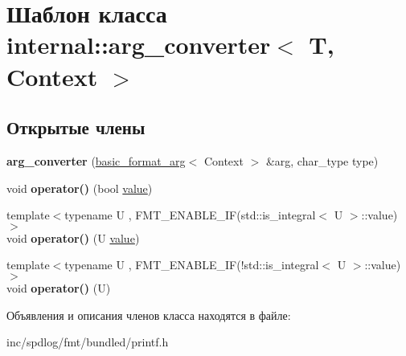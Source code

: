 \hypertarget{classinternal_1_1arg__converter}{}\section{Шаблон класса internal\+:\+:arg\+\_\+converter$<$ T, Context $>$}
\label{classinternal_1_1arg__converter}
\subsection*{Открытые члены}
\begin{DoxyCompactItemize}
\item 
\mbox{\label{classinternal_1_1arg__converter_a9a484710699c1df76cf5632ea4494e56}} 
{\bfseries arg\+\_\+converter} (\hyperlink{classbasic__format__arg}{basic\+\_\+format\+\_\+arg}$<$ Context $>$ \&arg, char\+\_\+type type)
\item 
\mbox{\label{classinternal_1_1arg__converter_aa1775af02483433ce44a1bccc58b1eb7}} 
void {\bfseries operator()} (bool \hyperlink{classinternal_1_1value}{value})
\item 
\mbox{\label{classinternal_1_1arg__converter_a348a41b7fbb0fa0799d2de08e36c804b}} 
{\footnotesize template$<$typename U , F\+M\+T\+\_\+\+E\+N\+A\+B\+L\+E\+\_\+\+I\+F(std\+::is\+\_\+integral$<$ U $>$\+::value) $>$ }\\void {\bfseries operator()} (U \hyperlink{classinternal_1_1value}{value})
\item 
\mbox{\label{classinternal_1_1arg__converter_ac07d070e0fe823ea5ca4bed3ba8b15fc}} 
{\footnotesize template$<$typename U , F\+M\+T\+\_\+\+E\+N\+A\+B\+L\+E\+\_\+\+I\+F(!std\+::is\+\_\+integral$<$ U $>$\+::value) $>$ }\\void {\bfseries operator()} (U)
\end{DoxyCompactItemize}


Объявления и описания членов класса находятся в файле\+:\begin{DoxyCompactItemize}
\item 
inc/spdlog/fmt/bundled/printf.\+h\end{DoxyCompactItemize}
